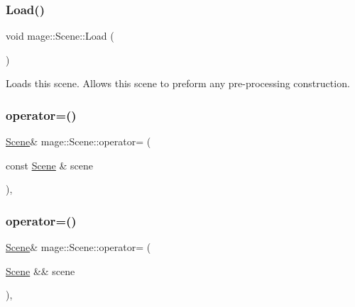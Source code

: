 \hypertarget{classmage_1_1_scene_a472443b059c8be0fcd223f6df8378934}{}\label{classmage_1_1_scene_a472443b059c8be0fcd223f6df8378934} 
\subsubsection{\texorpdfstring{Load()}{Load()}}
{\footnotesize\ttfamily void mage\+::\+Scene\+::\+Load (\begin{DoxyParamCaption}{ }\end{DoxyParamCaption})\hspace{0.3cm}{\ttfamily [virtual]}}

Loads this scene. Allows this scene to preform any pre-\/processing construction. \hypertarget{classmage_1_1_scene_a2c25c0fedc0230771d8c00a8288a69ce}{}\label{classmage_1_1_scene_a2c25c0fedc0230771d8c00a8288a69ce} 
\subsubsection{\texorpdfstring{operator=()}{operator=()}\hspace{0.1cm}{\footnotesize\ttfamily [1/2]}}
{\footnotesize\ttfamily \hyperlink{classmage_1_1_scene}{Scene}\& mage\+::\+Scene\+::operator= (\begin{DoxyParamCaption}\item[{const \hyperlink{classmage_1_1_scene}{Scene} \&}]{scene }\end{DoxyParamCaption})\hspace{0.3cm}{\ttfamily [private]}, {\ttfamily [delete]}}

\hypertarget{classmage_1_1_scene_a400926762670c9cd9b6d456291600f53}{}\label{classmage_1_1_scene_a400926762670c9cd9b6d456291600f53} 
\subsubsection{\texorpdfstring{operator=()}{operator=()}\hspace{0.1cm}{\footnotesize\ttfamily [2/2]}}
{\footnotesize\ttfamily \hyperlink{classmage_1_1_scene}{Scene}\& mage\+::\+Scene\+::operator= (\begin{DoxyParamCaption}\item[{\hyperlink{classmage_1_1_scene}{Scene} \&\&}]{scene }\end{DoxyParamCaption})\hspace{0.3cm}{\ttfamily [private]}, {\ttfamily [delete]}}

